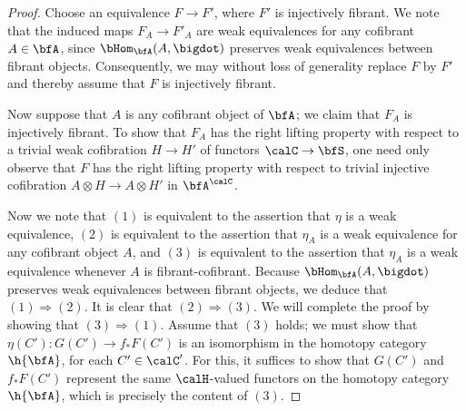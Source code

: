 \begin{proof}
Choose an equivalence $F \rightarrow F'$, where $F'$ is injectively fibrant. We note that
the induced maps $F_A \rightarrow F'_A$ are weak equivalences for any
cofibrant $A \in \bfA$, since $\bHom_{\bfA}(A, \bigdot)$ preserves weak equivalences between fibrant objects. Consequently, we may without loss of generality replace $F$ by $F'$ and thereby assume that $F$ is injectively fibrant.

Now suppose that $A$ is any cofibrant object of $\bfA$; we claim that
$F_A$ is injectively fibrant. To show that $F_A$ has
the right lifting property with respect to a trivial weak
cofibration $H \rightarrow H'$ of functors $\calC \rightarrow
\bfS$, one need only observe that $F$ has the right lifting
property with respect to trivial injective cofibration $A \otimes H
\rightarrow A \otimes H'$ in $\bfA^{\calC}$.

Now we note that $(1)$ is equivalent to the assertion that $\eta$ is a weak equivalence, $(2)$
is equivalent to the assertion that $\eta_{A}$ is a weak equivalence for any cofibrant object
$A$, and $(3)$ is equivalent to the assertion that $\eta_A$ is a weak equivalence whenever
$A$ is fibrant-cofibrant. Because $\bHom_{\bfA}(A, \bigdot)$ preserves weak equivalences between fibrant objects, we deduce that $(1) \Rightarrow (2)$. It is
clear that $(2) \Rightarrow (3)$. We will complete the proof by showing that $(3) \Rightarrow (1)$.
Assume that $(3)$ holds; we must show that
$\eta(C'): G(C') \rightarrow f_{\ast} F(C')$ is an isomorphism in the homotopy category $\h{\bfA}$,
for each $C' \in \calC'$.
For this, it suffices to show that $G(C')$ and $f_{\ast} F(C')$ represent the same $\calH$-valued functors on the homotopy category $\h{\bfA}$, which is precisely the content of $(3)$. 
\end{proof}

